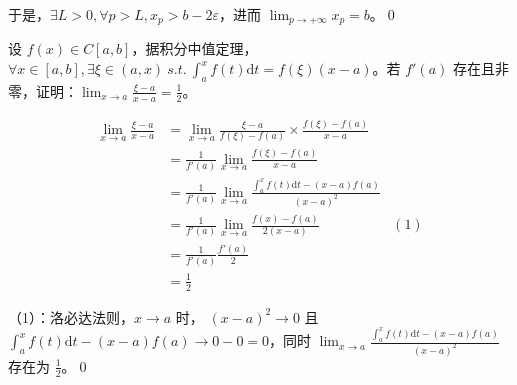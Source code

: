 于是，$\displaystyle \exists L >0,\forall p >L,x_{p}  >b-2\varepsilon $，进而 $\displaystyle \lim _{p\rightarrow +\infty } x_{p} =b$。\qed 



\begin{ques}
	设 $\displaystyle f( x) \in C[ a,b]$，据积分中值定理，$\displaystyle \forall x\in [ a,b] ,\exists \xi \in ( a,x) \ s.t.\ \int _{a}^{x} f( t)\mathrm{d} t=f( \xi )( x-a)$。若 $\displaystyle f'( a)$ 存在且非零，证明：$\displaystyle \lim _{x\rightarrow a}\frac{\xi -a}{x-a} =\frac{1}{2}$。
\end{ques}
\begin{align*}
	\lim _{x\rightarrow a}\frac{\xi -a}{x-a} & =\lim _{x\rightarrow a}\frac{\xi -a}{f( \xi ) -f( a)} \times \frac{f( \xi ) -f( a)}{x-a}\\
	& =\frac{1}{f'( a)}\lim _{x\rightarrow a}\frac{f( \xi ) -f( a)}{x-a}\\
	& =\frac{1}{f'( a)}\lim _{x\rightarrow a}\frac{\int _{a}^{x} f( t)\mathrm{d} t-( x-a) f( a)}{( x-a)^{2}}\\
	& =\frac{1}{f'( a)}\lim _{x\rightarrow a}\frac{f( x) -f( a)}{2( x-a)} & (1)\\
	& =\frac{1}{f'( a)}\frac{f'( a)}{2}\\
	& =\frac{1}{2}
\end{align*}

（1）：洛必达法则，$\displaystyle x\rightarrow a$ 时， $\displaystyle ( x-a)^{2}\rightarrow 0$ 且 $\displaystyle \int _{a}^{x} f( t)\mathrm{d} t-( x-a) f( a)\rightarrow 0-0=0$，同时 $\displaystyle \lim _{x\rightarrow a}\frac{\int _{a}^{x} f( t)\mathrm{d} t-( x-a) f( a)}{( x-a)^{2}}$ 存在为 $\displaystyle \frac{1}{2}$。\qed 

\ifx\allfiles\undefined

\fi